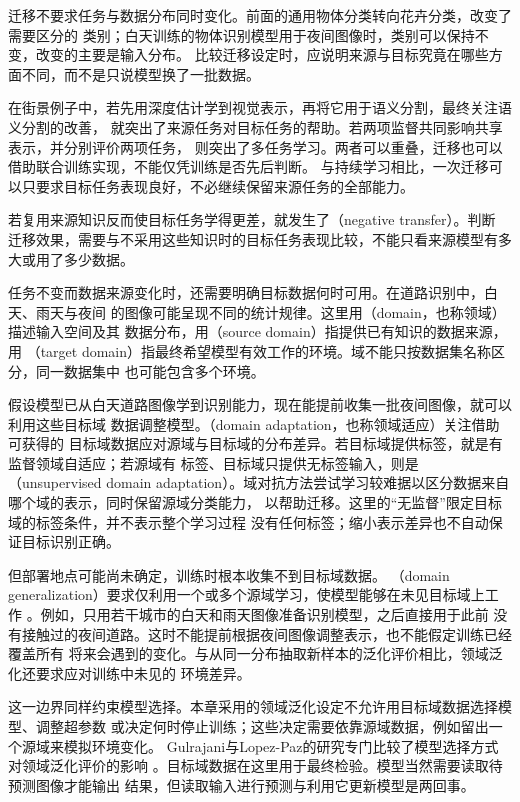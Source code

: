 迁移不要求任务与数据分布同时变化。前面的通用物体分类转向花卉分类，改变了需要区分的
类别；白天训练的物体识别模型用于夜间图像时，类别可以保持不变，改变的主要是输入分布。
比较迁移设定时，应说明来源与目标究竟在哪些方面不同，而不是只说模型换了一批数据。

在街景例子中，若先用深度估计学到视觉表示，再将它用于语义分割，最终关注语义分割的改善，
就突出了来源任务对目标任务的帮助。若两项监督共同影响共享表示，并分别评价两项任务，
则突出了多任务学习。两者可以重叠，迁移也可以借助联合训练实现，不能仅凭训练是否先后判断。
与持续学习相比，一次迁移可以只要求目标任务表现良好，不必继续保留来源任务的全部能力。

若复用来源知识反而使目标任务学得更差，就发生了（negative transfer）。判断
迁移效果，需要与不采用这些知识时的目标任务表现比较，不能只看来源模型有多大或用了多少数据。

任务不变而数据来源变化时，还需要明确目标数据何时可用。在道路识别中，白天、雨天与夜间
的图像可能呈现不同的统计规律。这里用（domain，也称领域）描述输入空间及其
数据分布，用（source domain）指提供已有知识的数据来源，用
（target domain）指最终希望模型有效工作的环境。域不能只按数据集名称区分，同一数据集中
也可能包含多个环境。

假设模型已从白天道路图像学到识别能力，现在能提前收集一批夜间图像，就可以利用这些目标域
数据调整模型。（domain adaptation，也称领域适应）关注借助可获得的
目标域数据应对源域与目标域的分布差异。若目标域提供标签，就是有监督领域自适应；若源域有
标签、目标域只提供无标签输入，则是（unsupervised domain
adaptation）。域对抗方法尝试学习较难据以区分数据来自哪个域的表示，同时保留源域分类能力，
以帮助迁移。这里的“无监督”限定目标域的标签条件，并不表示整个学习过程
没有任何标签；缩小表示差异也不自动保证目标识别正确。

但部署地点可能尚未确定，训练时根本收集不到目标域数据。
（domain generalization）要求仅利用一个或多个源域学习，使模型能够在未见目标域上工作
。例如，只用若干城市的白天和雨天图像准备识别模型，之后直接用于此前
没有接触过的夜间道路。这时不能提前根据夜间图像调整表示，也不能假定训练已经覆盖所有
将来会遇到的变化。与从同一分布抽取新样本的泛化评价相比，领域泛化还要求应对训练中未见的
环境差异。

这一边界同样约束模型选择。本章采用的领域泛化设定不允许用目标域数据选择模型、调整超参数
或决定何时停止训练；这些决定需要依靠源域数据，例如留出一个源域来模拟环境变化。
Gulrajani与Lopez-Paz的研究专门比较了模型选择方式对领域泛化评价的影响
。目标域数据在这里用于最终检验。模型当然需要读取待预测图像才能输出
结果，但读取输入进行预测与利用它更新模型是两回事。


